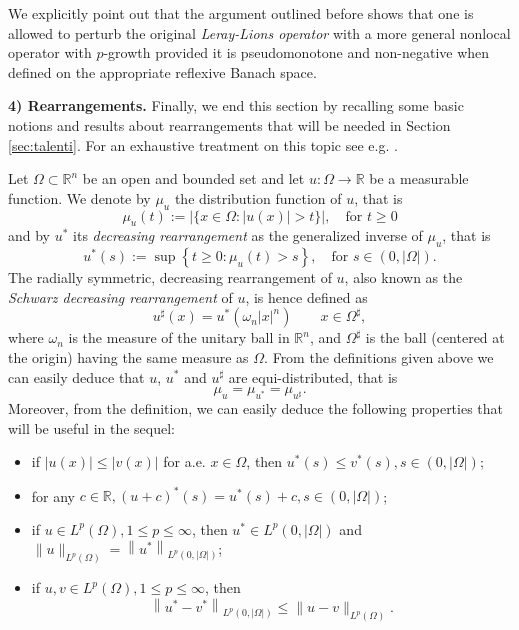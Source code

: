 \documentclass[11pt,a4paper]{amsart}
\def \R {\mathbb{R}}
\theoremstyle{definition}
\theoremstyle{plain}
\numberwithin{equation}{section}
\begin{document}
{  	We explicitly point out that the argument outlined before shows that one is al\-lowed to perturb the original {\it Leray-Lions operator} with a more general nonlocal operator with $p$-growth provided it is pseudomonotone and non-negative when defined on the appropriate reflexive Banach space.
\bigskip

\noindent \textbf{4) Rearrangements.}
Finally, we end this section by recalling some basic notions and results about rearrangements that will be needed in Section \ref{sec:talenti}. For an exhaustive treatment on this topic see e.g. \cite{Talenti,Talenti2}.
\vspace{0.1cm}

Let $\Omega \subset \mathbb{R}^{n}$ be an open and bounded set and let $u: \Omega \rightarrow \mathbb{R}$ be a measurable function. We denote by $\mu_{u}$ the distribution function of $u$, that is
$$
\mu_{u}(t):=|\{x \in \Omega:|u(x)|>t\}|, \quad\text{for } t \geq 0
$$
and by $u^{*}$ its \emph{decreasing rearrangement} as the generalized inverse of $\mu_u$, that is
$$
u^{\ast}(s):=\sup \left\{t\geq 0: \mu_{u}(t)>s\right\}, \quad \text{for }s \in(0,|\Omega|).
$$
The radially symmetric, decreasing rearrangement of $u$, also known as the \emph{Schwarz decreasing rearrangement} of $u$, is hence defined as 
$$u^{\sharp}(x)=u^\ast(\omega_n|x|^n)\qquad x \in \Omega^\sharp,
$$
where $\omega_n$ is the measure of the unitary ball in $\R^n$, and $\Omega^\sharp$ is the ball (centered at the origin) having the same measure as $\Omega$.
From the definitions given above we can easily deduce that $u$, $u^\ast$ and $u^\sharp$ are equi-distributed, that is 
$$
\mu_u=\mu_{u^\ast}=\mu_{u^\sharp}.
$$
Moreover, from the definition, we can easily deduce the following properties that will be useful in the sequel:
\begin{itemize}
	\item[i)]if $|u(x)| \leq|v(x)|$ for a.e. $x \in \Omega$, then $u^{*}(s) \leq v^{*}(s), s \in(0,|\Omega|)$;
	\item[ii)]for any $c \in \mathbb{R},(u+c)^{*}(s)=u^{*}(s)+c, s \in(0,|\Omega|)$;
	\item[iii)] if $u \in L^{p}(\Omega), 1 \leq p \leq \infty$, then $u^{*} \in L^{p}(0,|\Omega|)$ and $\|u\|_{L^{p}(\Omega)}=\left\|u^{*}\right\|_{L^{p}(0,|\Omega|)}$;
	\item[iv)] if $u, v \in L^{p}(\Omega), 1 \leq p \leq \infty$, then
	$$
	\left\|u^{*}-v^{*}\right\|_{L^{p}(0,|\Omega|)} \leq\|u-v\|_{L^{p}(\Omega)} .
	$$
\end{itemize}

}
\end{document}
